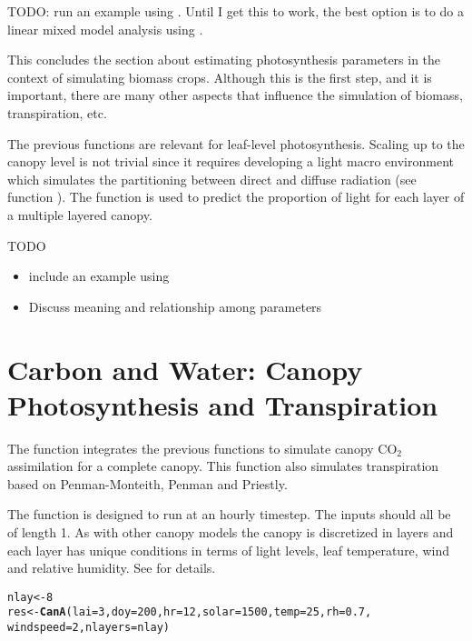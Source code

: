 \documentclass[12pt]{article}\usepackage[]{graphicx}\usepackage[]{color}
\makeatletter
\newcommand{\hlnum}[1]{\textcolor[rgb]{0.686,0.059,0.569}{#1}}%
\newcommand{\hlstd}[1]{\textcolor[rgb]{0.345,0.345,0.345}{#1}}%
\newcommand{\hlkwb}[1]{\textcolor[rgb]{0.69,0.353,0.396}{#1}}%
\newcommand{\hlkwc}[1]{\textcolor[rgb]{0.333,0.667,0.333}{#1}}%
\newcommand{\hlkwd}[1]{\textcolor[rgb]{0.737,0.353,0.396}{\textbf{#1}}}%
\newenvironment{kframe}{%
 \def\at@end@of@kframe{}%
 \ifinner\ifhmode%
  \def\at@end@of@kframe{\end{minipage}}%
  \begin{minipage}{\columnwidth}%
 \fi\fi%
 \def\FrameCommand##1{\hskip\@totalleftmargin \hskip-\fboxsep
 \colorbox{shadecolor}{##1}\hskip-\fboxsep
     \hskip-\linewidth \hskip-\@totalleftmargin \hskip\columnwidth}%
 \MakeFramed {\advance\hsize-\width
   \@totalleftmargin\z@ \linewidth\hsize
   \@setminipage}}%
 {\par\unskip\endMakeFramed%
 \at@end@of@kframe}
\newenvironment{knitrout}{}{} %
\makeatother
\begin{document}
TODO: run an example using . Until I get this to work, the best
option is to do a linear mixed model analysis using .

This concludes the section about estimating photosynthesis parameters in the
context of simulating biomass crops. Although this is the first step, and it is
important, there are many other aspects that influence the simulation of biomass,
transpiration, etc. 

The previous functions are relevant for leaf-level
photosynthesis. Scaling up to the canopy level is not trivial since it
requires developing a light macro environment which simulates the
partitioning between direct and diffuse radiation (see function
). The function  is used to predict the
proportion of light for each layer of a multiple layered canopy. 

TODO
\begin{itemize}
  \item include an example using 
  \item Discuss meaning and relationship among parameters
\end{itemize}

\section{Carbon and Water: Canopy Photosynthesis and Transpiration}

The function  integrates the previous functions
to simulate canopy CO$_2$ assimilation for a complete canopy. This
function also simulates transpiration based on Penman-Monteith, Penman
and Priestly. 

The  function is designed to run at an hourly timestep. The
inputs should all be of length 1. As with other canopy models the
canopy is discretized in layers and each layer has unique conditions
in terms of light levels, leaf temperature, wind and relative
humidity. See  for details.

\begin{knitrout}
\color{fgcolor}\begin{kframe}
\begin{alltt}
\hlstd{nlay} \hlkwb{<-} \hlnum{8}
\hlstd{res} \hlkwb{<-} \hlkwd{CanA}\hlstd{(}\hlkwc{lai}\hlstd{=}\hlnum{3}\hlstd{,} \hlkwc{doy}\hlstd{=}\hlnum{200}\hlstd{,} \hlkwc{hr}\hlstd{=}\hlnum{12}\hlstd{,} \hlkwc{solar}\hlstd{=}\hlnum{1500}\hlstd{,} \hlkwc{temp}\hlstd{=}\hlnum{25}\hlstd{,} \hlkwc{rh}\hlstd{=}\hlnum{0.7}\hlstd{,}
            \hlkwc{windspeed}\hlstd{=}\hlnum{2}\hlstd{,} \hlkwc{nlayers}\hlstd{=nlay)}
\end{alltt}
\end{kframe}
\end{knitrout}
\end{document}

